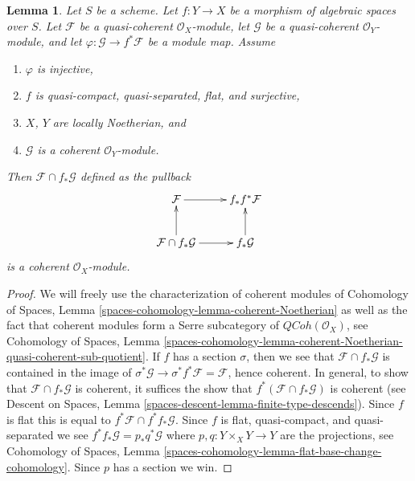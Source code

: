 \documentclass[10pt,a4paper]{amsart}
\theoremstyle{plain}
\newtheorem{lemma}[subsection]{Lemma}
\theoremstyle{definition}
\theoremstyle{remark}
\numberwithin{equation}{subsection}
\def\QCoh{\mathit{QCoh}}
\begin{document}
\begin{lemma}
\label{lemma-push-pull}
Let $S$ be a scheme.
Let $f : Y \to X$ be a morphism of algebraic spaces over $S$. Let $\mathcal{F}$
be a quasi-coherent $\mathcal{O}_X$-module, let $\mathcal{G}$
be a quasi-coherent $\mathcal{O}_Y$-module, and let
$\varphi : \mathcal{G} \to f^*\mathcal{F}$ be a module map. Assume
\begin{enumerate}
\item $\varphi$ is injective,
\item $f$ is quasi-compact, quasi-separated, flat, and surjective,
\item $X$, $Y$ are locally Noetherian, and
\item $\mathcal{G}$ is a coherent $\mathcal{O}_Y$-module.
\end{enumerate}
Then $\mathcal{F} \cap f_*\mathcal{G}$ defined as the pullback
$$
\xymatrix{
\mathcal{F} \ar[r] & f_*f^*\mathcal{F} \\
\mathcal{F} \cap f_*\mathcal{G} \ar[u] \ar[r] &
f_*\mathcal{G} \ar[u]
}
$$
is a coherent $\mathcal{O}_X$-module.
\end{lemma}

\begin{proof}
We will freely use the characterization of coherent modules of
Cohomology of Spaces, Lemma \ref{spaces-cohomology-lemma-coherent-Noetherian}
as well as the fact that coherent modules form a Serre subcategory
of $\QCoh(\mathcal{O}_X)$, see
Cohomology of Spaces, Lemma
\ref{spaces-cohomology-lemma-coherent-Noetherian-quasi-coherent-sub-quotient}.
If $f$ has a section $\sigma$, then we see that
$\mathcal{F} \cap f_*\mathcal{G}$ is contained in the image of
$\sigma^*\mathcal{G} \to \sigma^*f^*\mathcal{F} = \mathcal{F}$,
hence coherent. In general, to show that $\mathcal{F} \cap f_*\mathcal{G}$
is coherent, it suffices the show that
$f^*(\mathcal{F} \cap f_*\mathcal{G})$ is coherent (see
Descent on Spaces, Lemma \ref{spaces-descent-lemma-finite-type-descends}).
Since $f$ is flat this is equal to $f^*\mathcal{F} \cap f^*f_*\mathcal{G}$.
Since $f$ is flat, quasi-compact, and quasi-separated we see
$f^*f_*\mathcal{G} = p_*q^*\mathcal{G}$ where $p, q : Y \times_X Y \to Y$
are the projections, see Cohomology of Spaces, Lemma
\ref{spaces-cohomology-lemma-flat-base-change-cohomology}.
Since $p$ has a section we win.
\end{proof}
\end{document}
